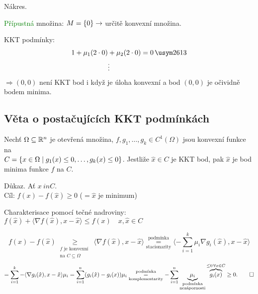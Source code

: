 \begin{multicols}{2}
    Nákres.

\columnbreak

    \textcolor{green}{Přípustná} množina: $M = \left\lbrace 0 \right\rbrace \rightarrow$ určitě konvexní množina.

    KKT podmínky: 
    \begin{align*}
        1 + \mu_1 (2 \cdot 0) &+ \mu_2 (2 \cdot 0) = 0 \, \xmark \\
        &\vdots
    \end{align*}
    $\Rightarrow (0,0)$ není KKT bod i když je úloha konvexní a bod $(0,0)$ je očividně bodem minima.
\end{multicols}

\subsection{Věta o postačujících KKT podmínkách}
Nechť $\Omega \subseteq \mathbb{R}^n$ je otevřená množina, $f, g_1, \dots, g_k \in C^1(\Omega)$ jsou konvexní funkce na \\
$C = \left\lbrace x \in \Omega \mid g_1(x) \leq 0, \dots, g_k(x) \leq 0 \right\rbrace$. Jestliže $\hat x \in C$ je KKT bod, pak $\hat x$ je bod 
minima funkce $f$ na $C$.

Důkaz. Ať $x \ in C$. \\
Cíl: $f(x) - f(\hat x) \geq 0$ ($= \hat x$ je minimum)

Charakterisace pomocí tečné nadroviny: $f(\hat x) + \langle \nabla f(\hat x), x - \hat x\rangle \leq f(x) \quad x, 
\hat x \in C$

\[
    f(x) - f(\hat x) \underset{\substack{\text{$f$ je konvexní } \\ \text{na $C \subseteq \Omega$}} }{\geq} \langle 
    \nabla f(\hat x), x - \hat x\rangle \underset{\text{stacionarity}}{\overset{\text{podmínka}}{=}} \langle - \sum_{i=1}^{k} \mu_i \nabla g_i(\hat x), 
    x - \hat x\rangle
\]
\[
    = \sum_{i=1}^{k} - \langle \nabla g_i(\hat x), x - \hat x \rangle \mu_i = \sum_{i=1}^{n} (g_i(\hat x) - g_i(x)) \mu_i 
    \underset{\text{komplementarity}}{\overset{\text{podmínka}}{=}} - \sum_{i=1}^{n}    
    \underbrace{\mu_i}_{\substack{\text{podmínka}\\ \text{nezápornosti}}} \overbrace{g_i(x)}^{\leq 0 \, \forall x \in C}
    \geq 0. \qed
\]

